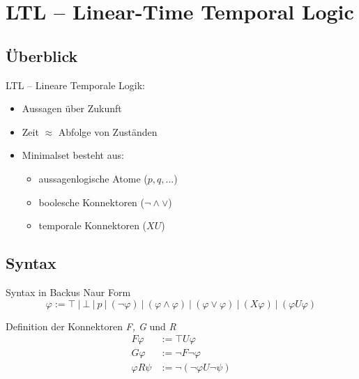\section{LTL -- Linear-Time Temporal Logic}

\subsection{Überblick}
\begin{frame}{\insertsubsection}
    LTL -- Lineare Temporale Logik:
    \vspace*{1em}
    \begin{itemize}
        \setlength\itemsep{1.5em}
        \item Aussagen über Zukunft
        \item Zeit $\approx$ Abfolge von Zuständen \cite{huth+04}
        \item Minimalset besteht aus:
        \begin{itemize}
            \item aussagenlogische Atome ($p, q, ...$) 
            \item boolesche Konnektoren ($\lnot \land \lor$)
            \item temporale Konnektoren ($X U$)
        \end{itemize}
    \end{itemize}
\end{frame}

\subsection{Syntax}
\begin{frame}{\insertsubsection}
    \begin{block}{Syntax in Backus Naur Form}
        \vspace*{-1em}
        \begin{equation*}
        \label{ltl:syntax_basics}
            \varphi := \top\ |\ \bot\ |\ p\ |\ (\lnot\varphi)\ |\ (\varphi \land \varphi)\ |\ (\varphi \lor \varphi)\ |\ (X\varphi)\ |\ (\varphi U\varphi)
        \end{equation*}
    \end{block}
    \vspace*{1em}
    \begin{block}{Definition der Konnektoren \textit{F, G} und \textit{R}}
        \vspace*{-1em}
        \begin{equation*}
        \label{ltl:syntax_details}
        \begin{split}
            F\varphi &:= \top U\varphi\\
            G\varphi &:= \lnot F\lnot\varphi\\
            \varphi R\psi &:= \lnot(\lnot\varphi U\lnot\psi)\\
        \end{split}
        \end{equation*}
    \end{block}
\end{frame}

